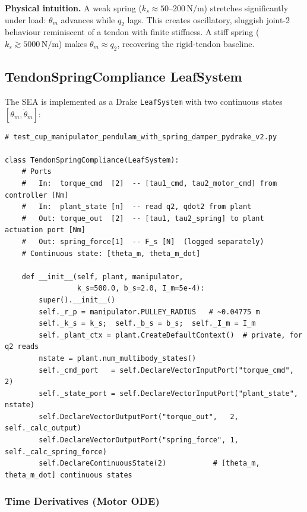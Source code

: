 \documentclass[11pt, a4paper]{article}
\begin{document}
\begin{mdframed}
\textbf{Physical intuition.}
A weak spring ($k_s \approx 50$--$200\,\text{N/m}$) stretches significantly under
load: $\theta_m$ advances while $q_2$ lags.  This creates oscillatory, sluggish
joint-2 behaviour reminiscent of a tendon with finite stiffness.
A stiff spring ($k_s \gtrsim 5000\,\text{N/m}$) makes $\theta_m \approx q_2$,
recovering the rigid-tendon baseline.
\end{mdframed}

\subsection{TendonSpringCompliance LeafSystem}

The SEA is implemented as a Drake \texttt{LeafSystem} with two continuous
states $[\theta_m, \dot\theta_m]$:

\begin{lstlisting}
# test_cup_manipulator_pendulam_with_spring_damper_pydrake_v2.py

class TendonSpringCompliance(LeafSystem):
    # Ports
    #   In:  torque_cmd  [2]  -- [tau1_cmd, tau2_motor_cmd] from controller [Nm]
    #   In:  plant_state [n]  -- read q2, qdot2 from plant
    #   Out: torque_out  [2]  -- [tau1, tau2_spring] to plant actuation port [Nm]
    #   Out: spring_force[1]  -- F_s [N]  (logged separately)
    # Continuous state: [theta_m, theta_m_dot]

    def __init__(self, plant, manipulator,
                 k_s=500.0, b_s=2.0, I_m=5e-4):
        super().__init__()
        self._r_p = manipulator.PULLEY_RADIUS   # ~0.04775 m
        self._k_s = k_s;  self._b_s = b_s;  self._I_m = I_m
        self._plant_ctx = plant.CreateDefaultContext()  # private, for q2 reads
        nstate = plant.num_multibody_states()
        self._cmd_port   = self.DeclareVectorInputPort("torque_cmd",  2)
        self._state_port = self.DeclareVectorInputPort("plant_state", nstate)
        self.DeclareVectorOutputPort("torque_out",   2, self._calc_output)
        self.DeclareVectorOutputPort("spring_force", 1, self._calc_spring_force)
        self.DeclareContinuousState(2)           # [theta_m, theta_m_dot] continuous states
\end{lstlisting}

\subsubsection{Time Derivatives (Motor ODE)}
\end{document}
